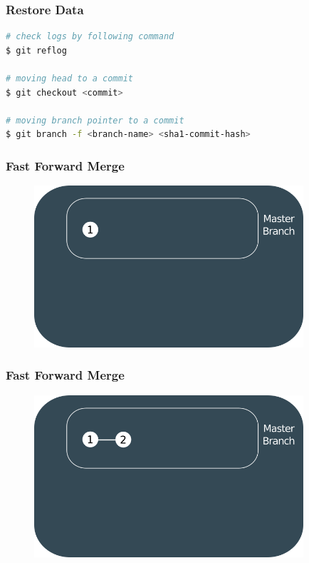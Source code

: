 \documentclass{beamer}
\begin{document}
	\begin{frame}[fragile]
		\frametitle{Restore Data}
		
\begin{lstlisting}[language=bash]
# check logs by following command
$ git reflog

# moving head to a commit
$ git checkout <commit>

# moving branch pointer to a commit
$ git branch -f <branch-name> <sha1-commit-hash>
\end{lstlisting}
	\end{frame}
	
	\begin{frame}
		\frametitle{Fast Forward Merge}
		\begin{figure}[htbp]
			\centering
			\includegraphics[width=10cm]{howgitwork9}
		\end{figure}
	\end{frame}
	
	\begin{frame}
		\frametitle{Fast Forward Merge}
		\begin{figure}[htbp]
			\centering
			\includegraphics[width=10cm]{howgitwork10}
		\end{figure}
	\end{frame}
	
\end{document}
